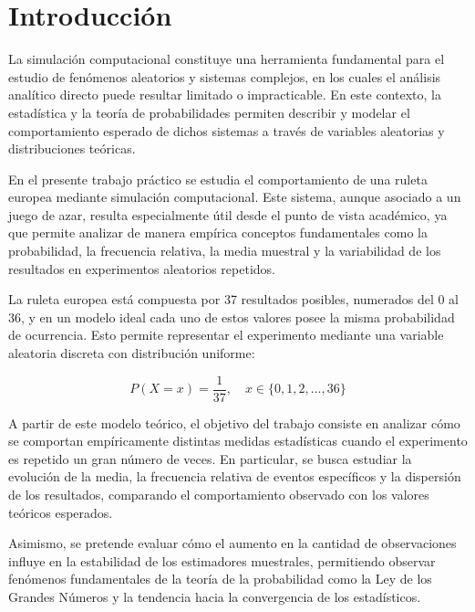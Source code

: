\documentclass{article}
\begin{document}



\newpage

\section{Introducción}

La simulación computacional constituye una herramienta fundamental para el estudio de fenómenos aleatorios y sistemas complejos, en los cuales el análisis analítico directo puede resultar limitado o impracticable. En este contexto, la estadística y la teoría de probabilidades permiten describir y modelar el comportamiento esperado de dichos sistemas a través de variables aleatorias y distribuciones teóricas.

En el presente trabajo práctico se estudia el comportamiento de una ruleta europea mediante simulación computacional. Este sistema, aunque asociado a un juego de azar, resulta especialmente útil desde el punto de vista académico, ya que permite analizar de manera empírica conceptos fundamentales como la probabilidad, la frecuencia relativa, la media muestral y la variabilidad de los resultados en experimentos aleatorios repetidos.

La ruleta europea está compuesta por 37 resultados posibles, numerados del 0 al 36, y en un modelo ideal cada uno de estos valores posee la misma probabilidad de ocurrencia. Esto permite representar el experimento mediante una variable aleatoria discreta con distribución uniforme:

\begin{equation}
    P(X = x) = \frac{1}{37}, \quad x \in \{0,1,2,\dots,36\}
\end{equation}

A partir de este modelo teórico, el objetivo del trabajo consiste en analizar cómo se comportan empíricamente distintas medidas estadísticas cuando el experimento es repetido un gran número de veces. En particular, se busca estudiar la evolución de la media, la frecuencia relativa de eventos específicos y la dispersión de los resultados, comparando el comportamiento observado con los valores teóricos esperados.

Asimismo, se pretende evaluar cómo el aumento en la cantidad de observaciones influye en la estabilidad de los estimadores muestrales, permitiendo observar fenómenos fundamentales de la teoría de la probabilidad como la Ley de los Grandes Números y la tendencia hacia la convergencia de los estadísticos.
\end{document}
